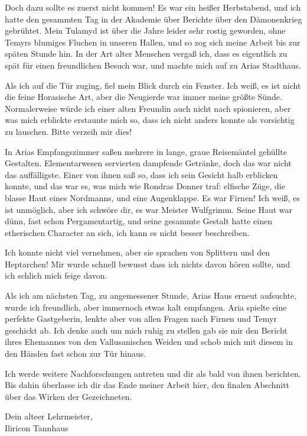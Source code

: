 Doch dazu sollte es zuerst nicht kommen! Es war ein heißer Herbstabend, und ich hatte den gesammten Tag in der Akademie über Berichte über den Dämonenkrieg gebrühtet. Mein Tulamyd ist über die Jahre leider sehr rostig geworden, ohne Temyrs blumiges Fluchen in unseren Hallen, und so zog sich meine Arbeit bis zur späten Stunde hin. In der Art alter Menschen vergaß ich, dass es eigentlich zu spät für einen freundlichen Besuch war, und machte mich auf zu Arias Stadthaus.

Als ich auf die Tür zuging, fiel mein Blick durch ein Fenster. Ich weiß, es ist nicht die feine Horasische Art, aber die Neugierde war immer meine größte Sünde. Normalerweise würde ich einer alten Freundin auch nicht nach spionieren, aber was mich erblickte erstaunte mich so, dass ich nicht anders konnte als vorsichtig zu lauschen. Bitte verzeih mir dies!

In Arias Empfangszimmer saßen mehrere in lange, graue Reisemäntel gehüllte Gestalten. Elementarwesen servierten dampfende Getränke, doch das war nicht das auffälligste. Einer von ihnen saß so, dass ich sein Gesicht halb erblicken konnte, und das war es, was mich wie Rondras Donner traf: elfische Züge, die blasse Haut eines Nordmanns, und eine Augenklappe. Es war Firnen! Ich weiß, es ist unmöglich, aber ich schwöre dir, es war Meister Wulfgrimm. Seine Haut war dünn, fast schon Pergamentartig, und seine gesammte Gestalt hatte einen etherischen Character an sich, ich kann es nicht besser beschreiben.

Ich konnte nicht viel vernehmen, aber sie sprachen von Splittern und den Heptarchen! Mir wurde schnell bewusst dass ich nichts davon hören sollte, und ich schlich mich feige davon.

Als ich am nächsten Tag, zu angemessener Stunde, Arias Haus erneut aufsuchte, wurde ich freundlich, aber immernoch etwas kalt empfangen. Aria spielte eine perfekte Gastgeberin, lenkte aber von allen Fragen nach Firnen und Temyr geschickt ab. Ich denke auch um mich ruhig zu stellen gab sie mir den Bericht ihres Ehemannes von den Vallusanischen Weiden und schob mich mit diesem in den Händen fast schon zur Tür hinaus.

Ich werde weitere Nachforschungen antreten und dir als bald von ihnen berichten. Bis dahin überlasse ich dir das Ende meiner Arbeit hier, den finalen Abschnitt über das Wirken der Gezeichneten.

Dein alteer Lehrmeister,\\
Iliricon Tannhaus


